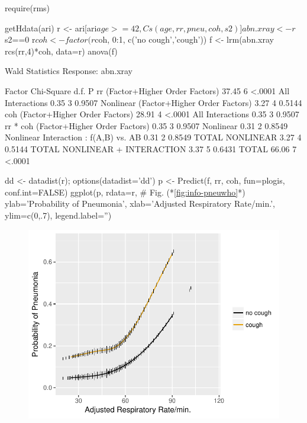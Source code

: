 \begin{Schunk}
\begin{Sinput}
require(rms)
\end{Sinput}
\begin{Sinput}
getHdata(ari)
r <- ari[ari$age >= 42, Cs(age, rr, pneu, coh, s2)]
abn.xray <- r$s2==0
r$coh <- factor(r$coh, 0:1, c('no cough','cough'))
f <- lrm(abn.xray ~ rcs(rr,4)*coh, data=r)
anova(f)
\end{Sinput}
\begin{Soutput}
                Wald Statistics          Response: abn.xray 

 Factor                                   Chi-Square d.f. P     
 rr  (Factor+Higher Order Factors)        37.45      6    <.0001
  All Interactions                         0.35      3    0.9507
  Nonlinear (Factor+Higher Order Factors)  3.27      4    0.5144
 coh  (Factor+Higher Order Factors)       28.91      4    <.0001
  All Interactions                         0.35      3    0.9507
 rr * coh  (Factor+Higher Order Factors)   0.35      3    0.9507
  Nonlinear                                0.31      2    0.8549
  Nonlinear Interaction : f(A,B) vs. AB    0.31      2    0.8549
 TOTAL NONLINEAR                           3.27      4    0.5144
 TOTAL NONLINEAR + INTERACTION             3.37      5    0.6431
 TOTAL                                    66.06      7    <.0001
\end{Soutput}
\begin{Sinput}
dd <- datadist(r); options(datadist='dd')
p <- Predict(f, rr, coh, fun=plogis, conf.int=FALSE)
ggplot(p, rdata=r,     # Fig. (*\ref{fig:info-pneuwho}*)
       ylab='Probability of Pneumonia',
       xlab='Adjusted Respiratory Rate/min.',
       ylim=c(0,.7), legend.label='')
\end{Sinput}
\begin{figure}[htbp]

\centerline{\includegraphics{info-pneuwho-1} }


\end{figure}
\end{Schunk}
